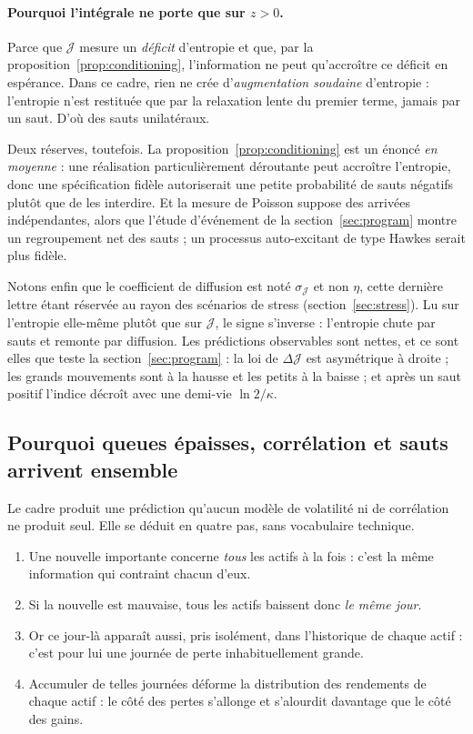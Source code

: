 \documentclass[11pt]{article}
\theoremstyle{definition}
\theoremstyle{remark}
\newcommand{\JJ}{\mathcal{J}}
\begin{document}
\paragraph{Pourquoi l'intégrale ne porte que sur $z>0$.} Parce que
$\JJ$ mesure un \emph{déficit} d'entropie et que, par la
proposition~\ref{prop:conditioning}, l'information ne peut qu'accroître ce
déficit en espérance. Dans ce cadre, rien ne crée d'\emph{augmentation soudaine}
d'entropie : l'entropie n'est restituée que par la relaxation lente du premier
terme, jamais par un saut. D'où des sauts unilatéraux.

Deux réserves, toutefois. La proposition~\ref{prop:conditioning} est un énoncé
\emph{en moyenne} : une réalisation particulièrement déroutante peut accroître
l'entropie, donc une spécification fidèle autoriserait une petite probabilité de
sauts négatifs plutôt que de les interdire. Et la mesure de Poisson suppose des
arrivées indépendantes, alors que l'étude d'événement de la
section~\ref{sec:program} montre un regroupement net des sauts ; un processus
auto-excitant de type Hawkes serait plus fidèle.

Notons enfin que le coefficient de diffusion est noté $\sigma_\JJ$ et non
$\eta$, cette dernière lettre étant réservée au rayon des scénarios de stress
(section~\ref{sec:stress}). Lu sur l'entropie elle-même plutôt que sur
$\JJ$, le signe s'inverse : l'entropie chute par sauts et remonte par diffusion.
Les prédictions observables sont nettes, et ce sont elles que teste la
section~\ref{sec:program} : la loi de $\Delta\JJ$ est asymétrique à droite ;
les grands mouvements sont à la hausse et les petits à la baisse ; et après un
saut positif l'indice décroît avec une demi-vie $\ln 2/\kappa$.

\subsection{Pourquoi queues épaisses, corrélation et sauts arrivent ensemble}

Le cadre produit une prédiction qu'aucun modèle de volatilité ni de corrélation
ne produit seul. Elle se déduit en quatre pas, sans vocabulaire technique.

\begin{enumerate}
\item Une nouvelle importante concerne \emph{tous} les actifs à la fois : c'est
la même information qui contraint chacun d'eux.
\item Si la nouvelle est mauvaise, tous les actifs baissent donc \emph{le même
jour}.
\item Or ce jour-là apparaît aussi, pris isolément, dans l'historique de chaque
actif : c'est pour lui une journée de perte inhabituellement grande.
\item Accumuler de telles journées déforme la distribution des rendements de
chaque actif : le côté des pertes s'allonge et s'alourdit davantage que le côté
des gains.
\end{enumerate}
\end{document}
